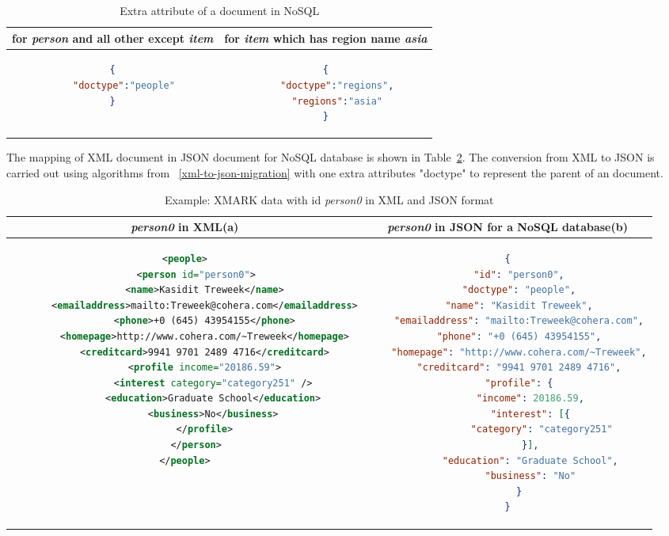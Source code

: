 \begin{longtable}{c|c}
	\caption{ Extra attribute of a document in NoSQL}
	\label{tbl:xmark-item-type}\\
    {for \textit{person} and all other except \textit{item} } & {for \textit{item} which has region name \textit{asia}}\\
	\hline
\begin{minipage}{.4\textwidth}
\begin{lstlisting}[language=JSON]
{
	"doctype":"people"
}
\end{lstlisting}
\end{minipage} &
\begin{minipage}{.4\textwidth}
\begin{lstlisting}[language=JSON]
{
	"doctype":"regions",
	"regions":"asia"
}
\end{lstlisting}
\end{minipage}
\end{longtable}

The mapping of XML document in JSON document for NoSQL database is shown in Table~\ref{tbl:xmark-xml-json}. The conversion from XML to JSON is carried out using  algorithms from ~\ref{xml-to-json-migration} with one extra attributes "doctype" to represent the parent of an document.
\begin{longtable}{c|c}
	\caption{Example: XMARK data with id \textit{person0} in XML and JSON format }
	\label{tbl:xmark-xml-json}\\
	{\textit{person0}} in XML(a) & {\textit{person0}} in JSON for a NoSQL database(b)\\
	\hline
	\begin{minipage}{.4\textwidth}
\centering		
\begin{lstlisting}[language=XML,basicstyle = \tiny,label=code:xml-nosql-person0]
<people>
    <person id="person0">
       <name>Kasidit Treweek</name>
       <emailaddress>mailto:Treweek@cohera.com</emailaddress>
       <phone>+0 (645) 43954155</phone>
       <homepage>http://www.cohera.com/~Treweek</homepage>
       <creditcard>9941 9701 2489 4716</creditcard>
       <profile income="20186.59">
          <interest category="category251" />
          <education>Graduate School</education>
          <business>No</business>
       </profile>
    </person>
</people>
\end{lstlisting}	
	\end{minipage} &
	\begin{minipage}{.55\textwidth}
		\centering
		\begin{lstlisting}[language=JSON, basicstyle =\tiny, label=code:json-nosql-person0]
{
	"id": "person0",
	"doctype": "people",
	"name": "Kasidit Treweek",
	"emailaddress": "mailto:Treweek@cohera.com",
	"phone": "+0 (645) 43954155",
	"homepage": "http://www.cohera.com/~Treweek",
	"creditcard": "9941 9701 2489 4716",
	"profile": {
		"income": 20186.59,
		"interest": [{
			"category": "category251"
		}],
		"education": "Graduate School",
		"business": "No"
	}
}
		\end{lstlisting}
	\end{minipage}\\
\end{longtable}

